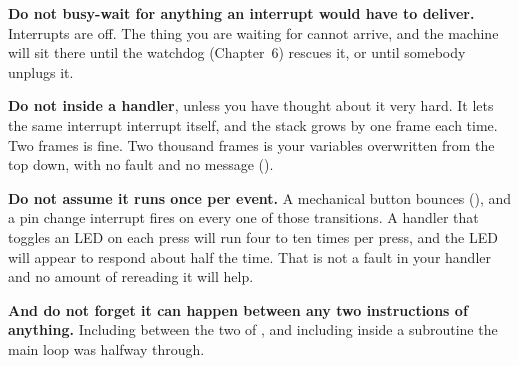 \textbf{Do not busy-wait for anything an interrupt would have to deliver.} Interrupts are off. The
thing you are waiting for cannot arrive, and the machine will sit there until the watchdog
(Chapter~6) rescues it, or until somebody unplugs it.

\textbf{Do not  inside a handler}, unless you have thought about it very hard. It lets
the same interrupt interrupt itself, and the stack grows by one frame each time. Two frames is
fine. Two thousand frames is your variables overwritten from the top down, with no fault and no
message ().

\textbf{Do not assume it runs once per event.} A mechanical button bounces
(), and a pin change interrupt fires on every one of those transitions. A
handler that toggles an LED on each press will run four to ten times per press, and the LED will
appear to respond about half the time. That is not a fault in your handler and no amount of
rereading it will help.

\textbf{And do not forget it can happen between any two instructions of anything.} Including
between the two  of , and including inside a subroutine the main
loop was halfway through.
